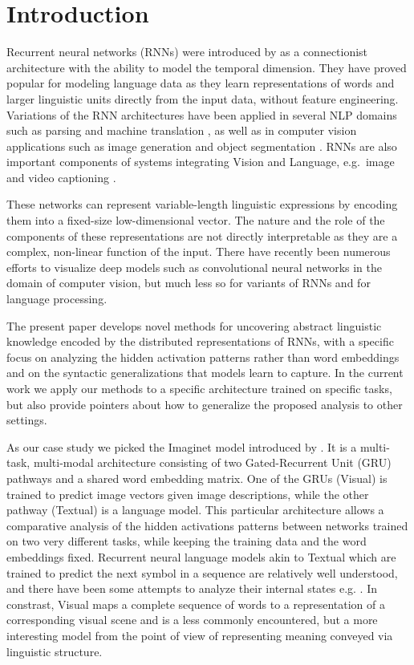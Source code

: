 \section{Introduction}
\label{sec:intro}
Recurrent neural networks (RNNs) were introduced by
as a connectionist architecture with the
ability to model the temporal dimension. They have proved popular for
modeling language data as they learn representations of words and
larger linguistic units directly from the input data, without feature
engineering. Variations of the RNN architectures have been applied in
several NLP domains such as parsing \cite{vinyals2015grammar} and
machine translation \cite{bahdanau2014neural}, as well as in computer
vision applications such as image generation \cite{gregor2015draw} and
object segmentation \cite{visin2015reseg}. RNNs are also important
components of systems integrating Vision and Language, e.g.\ image
\cite{karpathy2015deep} and video captioning \cite{yu2015video}.

These networks can represent variable-length linguistic expressions by
encoding them into a fixed-size low-dimensional vector. The nature and
the role of the components of these representations are not directly
interpretable as they are a complex, non-linear function of the
input. There have recently been numerous efforts to visualize deep
models such as convolutional neural networks in the domain of computer
vision, but much less so for variants of RNNs and for language
processing.
 
The present paper develops novel methods for uncovering abstract
linguistic knowledge encoded by the distributed representations of RNNs,
with a specific focus on analyzing the hidden activation patterns rather 
than word embeddings and on the syntactic generalizations 
that models learn to capture. In the current work we apply our methods
to a specific architecture trained on specific tasks, but also provide
pointers about how to generalize the proposed analysis to other settings.\label{generalintro}

As our case study we picked the {\sc Imaginet} model introduced by \label{explainimaginet}
\cite{chrupala2015learning}. It is a multi-task, multi-modal
architecture consisting of two Gated-Recurrent Unit (GRU)
\cite{cho2014properties,chung2014empirical} pathways and
a shared word embedding matrix. One of the GRUs ({\sc Visual}) is
trained to predict image vectors given image descriptions, while the other
pathway ({\sc Textual}) is a language model. This particular
architecture allows a comparative analysis of the hidden activations
patterns between networks trained on two very different tasks, while
keeping the training data and the word embeddings fixed. Recurrent neural
language models akin to {\sc Textual} which are trained to predict the
next symbol in a sequence are relatively well understood, and there
have been some attempts to analyze their internal states e.g.
\cite{elman1991distributed,karpathy2015visualizing}. In
constrast, {\sc Visual} maps a complete sequence of words to
a representation of a corresponding visual scene and is a less
commonly encountered, but a more interesting model from the point of
view of representing meaning conveyed via linguistic structure.

